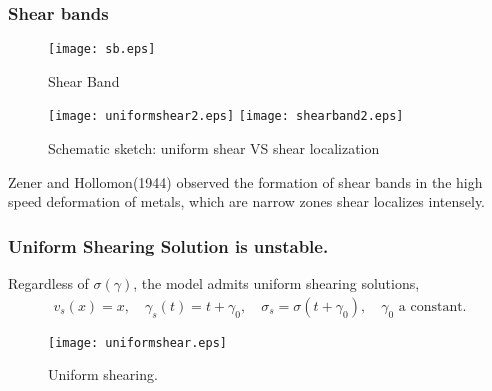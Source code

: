 \documentclass{beamer}
\def\red{\color{red}}
\begin{document}
\begin{frame}
 \frametitle{Shear bands}
 \begin{minipage}{0.3\linewidth}
 \begin{figure}
    \centering
    {
      \texttt{[image: sb.eps]} 
    } 
    \caption{Shear Band}
 \end{figure}
 \end{minipage}
  \hfill
 \begin{minipage}{0.6\linewidth}
 \begin{figure}
      \texttt{[image: uniformshear2.eps]}
     \quad \quad \quad
      \texttt{[image: shearband2.eps]}
    \caption{Schematic sketch: uniform shear VS shear localization}
 \end{figure}
 \end{minipage}
 
 Zener and Hollomon(1944) observed the formation of shear bands in the high speed deformation of metals, which are narrow zones shear localizes intensely.
 \vfill
\end{frame}

\begin{frame}
 \frametitle{Uniform Shearing Solution is unstable.}
 Regardless of $\sigma(\gamma)$, the model admits {\red uniform shearing solutions},
 \begin{align*}
  v_s(x) = x, \quad \gamma_s(t) = t + \gamma_0, \quad \sigma_s = \sigma(t + \gamma_0), \quad \text{$\gamma_0$ a constant}.
 \end{align*}
 
  \begin{figure}
    \center
    \texttt{[image: uniformshear.eps]}
    \caption{{\footnotesize Uniform shearing.}}
  \end{figure}
  
\end{frame}
\end{document}
